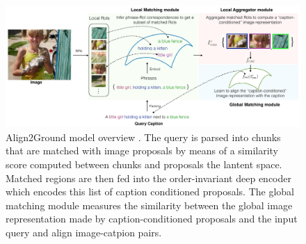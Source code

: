 \begin{figure}
  \centering
  \includegraphics[width=.8\textwidth]{figures/align2ground-model.png}
  \caption[Align2Ground model overview]{Align2Ground model overview
  \cite{datta2019align2ground}. The query is parsed into chunks that
  are matched with image proposals by means of a similarity score
  computed between chunks and proposals the lantent space. Matched
  regions are then fed into the order-invariant deep encoder which
  encodes this list of caption conditioned proposals. The global
  matching module measures the similarity between the global image
  representation made by caption-conditioned proposals and the input
  query and align image-catpion pairs.}
  \label{fig:align2ground-model}
\end{figure}


